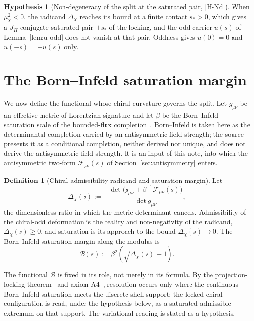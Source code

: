 \documentclass[11pt]{article}
\theoremstyle{definition}
\newtheorem{definition}{Definition}
\newtheorem{hypothesis}{Hypothesis}
\theoremstyle{remark}
\newcommand{\JPi}{J_{\Pi}}
\newcommand{\Fchi}{\mathcal{F}}
\newcommand{\Bsat}{\mathcal{B}}
\newcommand{\Dchi}{\Delta_{\chi}}
\newcommand{\muchi}{\mu_{\chi}^{2}}
\begin{document}
    \begin{hypothesis}[Non-degeneracy of the split at the saturated pair, {[H-Nd]}]
      \label{hyp:nondegenerate}
      When $\muchi<0$, the radicand $\Dchi$ reaches its bound at a finite contact $s_*>0$, which gives a
      $\JPi$-conjugate saturated pair $\pm s_*$ of the locking, and the odd carrier $u(s)$ of
      Lemma~\ref{lem:u-odd} does not vanish at that pair.
      Oddness gives $u(0)=0$ and $u(-s)=-u(s)$ only.
    \end{hypothesis}

  \section{The Born--Infeld saturation margin}
    \label{sec:margin}

    We now define the functional whose chiral curvature governs the split.
    Let $g_{\mu\nu}$ be an effective metric of Lorentzian signature and let $\beta$ be the
    Born--Infeld saturation scale of the bounded-flux completion~\cite{Beau2026c}.
    Born--Infeld is taken here as the determinantal completion carried by an antisymmetric field strength; the
    source~\cite{Beau2026c} presents it as a conditional completion, neither derived nor unique, and does not derive the
    antisymmetric field strength.
    It is an input of this note, into which the antisymmetric two-form $\Fchi_{\mu\nu}(s)$ of
    Section~\ref{sec:antisymmetry} enters.

    \begin{definition}[Chiral admissibility radicand and saturation margin]
      \label{def:B}
      Let
      \begin{equation}
        \label{eq:Dchi}
        \Dchi(s) := \frac{-\det\!\big(g_{\mu\nu} + \beta^{-1} \Fchi_{\mu\nu}(s)\big)}{-\det g_{\mu\nu}} ,
      \end{equation}
      the dimensionless ratio in which the metric determinant cancels.
      Admissibility of the chiral-odd deformation is the reality and non-negativity of the radicand, $\Dchi(s) \geq 0$, and
      saturation is its approach to the bound $\Dchi(s) \to 0$.
      The Born--Infeld saturation margin along the modulus is
      \begin{equation}
        \label{eq:B}
        \Bsat(s) := \beta^2 \left( \sqrt{\Dchi(s)} - 1 \right) .
      \end{equation}
    \end{definition}

    The functional $\Bsat$ is fixed in its role, not merely in its formula.
    By the projection-locking theorem~\cite{Beau2026a26} and axiom A4~\cite{Beau2026m}, resolution occurs only where the
    continuous Born--Infeld saturation meets the discrete shell support; the locked chiral configuration is read, under
    the hypothesis below, as a
    saturated admissible extremum on that support.
    The variational reading is stated as a hypothesis.
\end{document}

